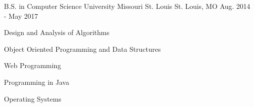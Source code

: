 

\begin{cventries}

  \cventry
    {B.S. in Computer Science} %
    {University Missouri St. Louis} %
    {St. Louis, MO} %
    {Aug. 2014 - May 2017} %
    {
      \begin{cvitems} %
        \item Design and Analysis of Algorithms
        \item Object Oriented Programming and Data Structures
        \item Web Programming
        \item Programming in Java
        \item Operating Systems
      \end{cvitems}
    }
  \vspace{-2mm}
\end{cventries}
